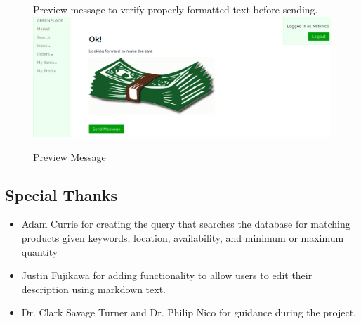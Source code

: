 \documentclass[letterpaper, 10 pt, conference]{ieeeconf}  %
\begin{document}
\begin{figure}[H]
  \caption{Preview Message}
  Preview message to verify properly formatted text before sending.\\
  \label{fig:previewmessage}
  \centering
    \includegraphics[width=\textwidth]{images/previewmessage.png}
\end{figure}

\subsection{Special Thanks}

\begin{itemize}
  \item Adam Currie for creating the query that searches the database for matching products given keywords, location, availability, and minimum or maximum quantity
  \item Justin Fujikawa for adding functionality to allow users to edit their description using markdown text.
  \item Dr. Clark Savage Turner and Dr. Philip Nico for guidance during the project.
\end{itemize}
\end{document}
